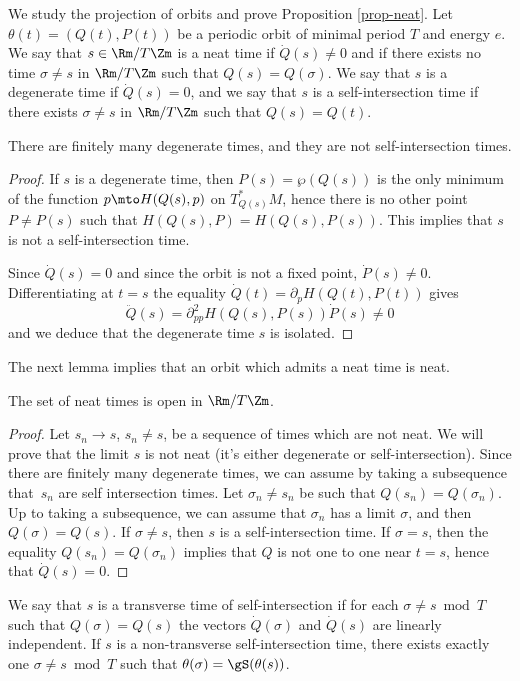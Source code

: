 We study the projection of orbits and prove Proposition \ref{prop-neat}.
Let $\theta(t)=(Q(t),P(t))$ be a periodic orbit of minimal period $T$ and energy $e$.
We say that $s\in \Rm/T\Zm$ is a neat time if $\dot Q(s) \neq 0$ and if there exists no time $\sigma \neq s$ in $\Rm/T\Zm$ such that $Q(s)=Q(\sigma)$.
We say that $s$ is a degenerate time if $\dot Q(s)=0$, and we say that $s$ is a self-intersection time if there exists $\sigma \neq s$ in $\Rm/T\Zm$ such that $Q(s)=Q(t)$.

\begin{lem}
There are finitely many degenerate times, and they are not self-intersection times.
\end{lem}

\begin{proof}
If $s$ is a degenerate time, then $P(s)=\wp(Q(s))$ is the only minimum of the function $p\mto H(Q(s),p)$ on $T^*_{Q(s)}M$, hence there is no other point $P\neq P(s)$ such that
$H(Q(s),P)=H(Q(s), P(s))$. This implies that $s$ is not a self-intersection time.

Since $\dot Q(s)=0$ and since the orbit is not a fixed point, $\dot P(s)\neq 0$.
Differentiating at $t=s$ the equality $\dot Q(t)=\partial_p H(Q(t), P(t))$ gives
\[
\ddot Q(s)=\partial^2_{pp}H(Q(s), P(s))\dot P(s)\neq 0
\]
and we deduce that the degenerate time $s$ is isolated.
\end{proof}

The next lemma implies that an orbit which admits a neat time is neat.

\begin{lem}
The set of neat times is open in $\Rm/T\Zm$.
\end{lem}

\begin{proof}
Let $s_n\to s$, $s_n\neq s$, be a sequence of times which are not neat. We will prove that the limit $s$ is not neat (it's either degenerate or self-intersection). Since there are finitely many degenerate times, we can assume by taking a subsequence that~$s_n$ are self intersection times.
Let $\sigma _n\neq s_n$ be such that $Q(s_n)=Q(\sigma_n)$.
Up to taking a subsequence, we can assume that $\sigma_n$ has a limit $\sigma$, and then $Q(\sigma)=Q(s)$. If $\sigma\neq s$, then $s$ is a self-intersection time.
If $\sigma= s$, then the equality $Q(s_n)=Q(\sigma_n)$ implies that $Q$ is not one to one near $t=s$, hence that $\dot Q(s)=0$.
\end{proof}

We say that $s$ is a transverse time of self-intersection if for each $\sigma\neq s \bmod T$ such that $Q(\sigma)=Q(s)$ the vectors
$\dot Q(\sigma)$ and $\dot Q(s)$ are linearly independent.
If $s$ is a non-transverse self-intersection time, there exists exactly one $\sigma \neq s\bmod T$ such that
$\theta(\sigma)=\gS (\theta(s))$.

